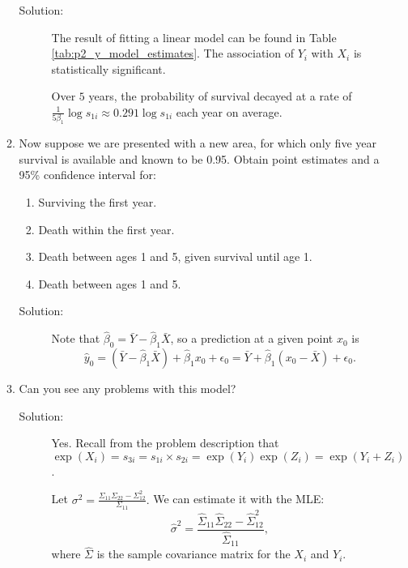\documentclass[letterpaper,11pt]{article}
\begin{document}
\begin{enumerate}
\begin{enumerate}
  \begin{description}
  \item[Solution:] The result of fitting a linear model can be found in Table
    \ref{tab:p2_y_model_estimates}. The association of $Y_{i}$ with $X_{i}$ is
    statistically significant.

    Over $5$ years, the probability of survival decayed at a rate of
    $\frac{1}{5\beta_1}\log s_{1i} \approx 0.291\log s_{1i}$ each year on
    average.
  \end{description}
\item Now suppose we are presented with a new area, for which only five year
  survival is available and known to be 0.95. Obtain point estimates and a
  95\% confidence interval for:
  \begin{enumerate}
  \item Surviving the first year.
  \item Death within the first year.
  \item Death between ages 1 and 5, given survival until age 1.
  \item Death between ages 1 and 5.
  \end{enumerate}

  \begin{description}
  \item[Solution:] Note that $\hat{\beta}_0 = \bar{Y} - \hat{\beta}_1\bar{X}$,
    so a prediction at a given point $x_0$ is
    \begin{equation}
      \hat{y}_0
      = \left(\bar{Y} - \hat{\beta}_1\bar{X}\right) + \hat{\beta}_1x_0 + \epsilon_0
      = \bar{Y} + \hat{\beta}_1\left(x_0 - \bar{X}\right)  + \epsilon_0.
    \end{equation}    
  \end{description}
\item Can you see any problems with this model?
  \begin{description}
  \item[Solution:] Yes. Recall from the problem description that
    $\exp\left(X_i\right) = s_{3i} = s_{1i} \times s_{2i} =
    \exp\left(Y_i\right)\exp\left(Z_i\right) = \exp\left(Y_i + Z_i\right)$.

    Let $\sigma^2 = \frac{\Sigma_{11}\Sigma_{22} - \Sigma_{12}^2}{\Sigma_{11}}.$
    We can estimate it with the MLE:
    \begin{equation}
      \hat{\sigma}^2 = \frac{\hat{\Sigma}_{11}\hat{\Sigma}_{22} - \hat{\Sigma}_{12}^2}
      {\hat{\Sigma}_{11}},
    \end{equation}
    where $\hat{\Sigma}$ is the sample covariance matrix for the $X_i$ and $Y_i$.


\end{description}
\end{enumerate}
\end{enumerate}
\end{document}
